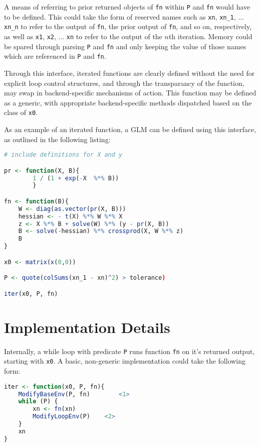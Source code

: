\documentclass[a4paper,10pt]{article}
\begin{document}
A means of referring to prior returned objects of \texttt{fn} within \texttt{P}
and \texttt{fn} would have to be defined.
This could take the form of reserved names such as \texttt{xn}, \texttt{xn\_1},
... \texttt{xn\_n} to refer to the output of \texttt{fn}, the prior output of
\texttt{fn}, and so on, respectively, as well as \texttt{x1}, \texttt{x2}, ...
\texttt{xn} to refer to the output of the \(n\)th iteration.
Memory could be spared through parsing \texttt{P} and \texttt{fn} and only
keeping the value of those names which are referenced in \texttt{P} and
\texttt{fn}.

Through this interface, iterated functions are clearly defined without the need
for explicit loop control structures, and through the transparancy of the
function, may swap in backend-specific mechanisms of action.
This function may be defined as a generic, with appropriate backend-specific
methods dispatched based on the class of \texttt{x0}.

As an example of an iterated function, a GLM can be defined using this
interface, as outlined in the following listing:

\begin{lstlisting}[float, language=R]
# include definitions for X and y

pr <- function(X, B){
		1 / (1 + exp(-X  %*% B))
		}

fn <- function(B){
	W <- diag(as.vector(pr(X, B)))
	hessian <- - t(X) %*% W %*% X
	z <- X %*% B + solve(W) %*% (y - pr(X, B))
	B <- solve(-hessian) %*% crossprod(X, W %*% z)
	B
}

x0 <- matrix(x(0,0))

P <- quote(colSums(xn_1 - xn)^2) > tolerance)

iter(x0, P, fn)
\end{lstlisting}

\section{Implementation Details}

Internally, a while loop with predicate \texttt{P} runs function \texttt{fn} on
it's returned output, starting with \texttt{x0}.
A basic, non-generic implementation could take the following form:

\begin{lstlisting}[float, language=R]
iter <- function(x0, P, fn){
	ModifyBaseEnv(P, fn)		<1>
	while (P) {
		xn <- fn(xn)
		ModifyLoopEnv(P)	<2>
	}
	xn
}
\end{lstlisting}
\end{document}
